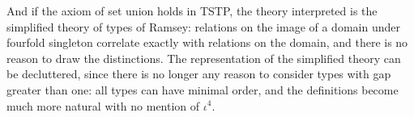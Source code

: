 \documentclass[12pt]{article}
\begin{document}
And if the axiom of set union holds in TSTP, the theory interpreted is the simplified theory of types of Ramsey:  relations
on the image of a domain under fourfold singleton correlate exactly with relations on the domain, and there is no reason to draw the distinctions.  The representation of the simplified theory can be decluttered, since there is no longer any reason to consider types with gap greater than one:  all types can have minimal order, and the definitions become much more natural with no mention of $\iota^4$.
\end{document}
